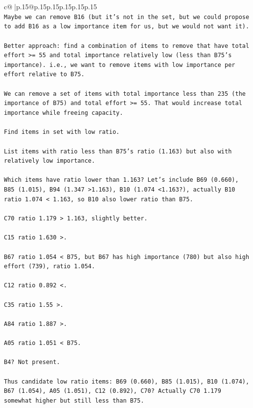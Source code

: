 \documentclass{article}
\begin{document}
{\begin{supertabular}{c@{$\;$}|p{.15\linewidth}@{}p{.15\linewidth}p{.15\linewidth}p{.15\linewidth}p{.15\linewidth}p{.15\linewidth}}
{{{\\ 
\texttt{Maybe we can remove B16 (but it's not in the set, but we could propose to add B16 as a low importance item for us, but we would not want it).} \\
\\ 
\texttt{Better approach: find a combination of items to remove that have total effort >= 55 and total importance relatively low (less than B75's importance). i.e., we want to remove items with low importance per effort relative to B75.} \\
\\ 
\texttt{We can remove a set of items with total importance less than 235 (the importance of B75) and total effort >= 55. That would increase total importance while freeing capacity.} \\
\\ 
\texttt{Find items in set with low ratio.} \\
\\ 
\texttt{List items with ratio less than B75's ratio (1.163) but also with relatively low importance.} \\
\\ 
\texttt{Which items have ratio lower than 1.163? Let's include B69 (0.660), B85 (1.015), B94 (1.347 >1.163), B10 (1.074 <1.163?), actually B10 ratio 1.074 < 1.163, so B10 also lower ratio than B75.} \\
\\ 
\texttt{C70 ratio 1.179 > 1.163, slightly better.} \\
\\ 
\texttt{C15 ratio 1.630 >.} \\
\\ 
\texttt{B67 ratio 1.054 < B75, but B67 has high importance (780) but also high effort (739), ratio 1.054.} \\
\\ 
\texttt{C12 ratio 0.892 <.} \\
\\ 
\texttt{C35 ratio 1.55 >.} \\
\\ 
\texttt{A84 ratio 1.887 >.} \\
\\ 
\texttt{A05 ratio 1.051 < B75.} \\
\\ 
\texttt{B4? Not present.} \\
\\ 
\texttt{Thus candidate low ratio items: B69 (0.660), B85 (1.015), B10 (1.074), B67 (1.054), A05 (1.051), C12 (0.892), C70? Actually C70 1.179 somewhat higher but still less than B75.} \\
}}}
\end{supertabular}}
\end{document}
